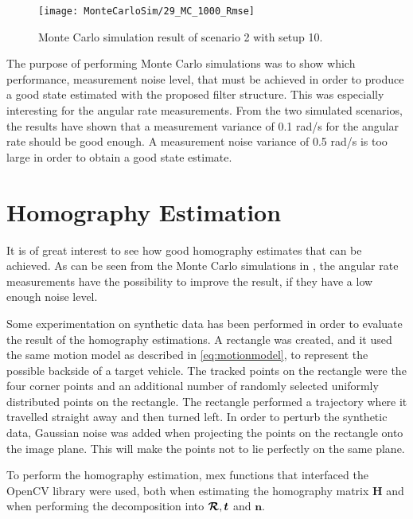 \begin{figure}[!ht]
	\centering
	\texttt{[image: MonteCarloSim/29\_MC\_1000\_Rmse]}
	\caption{\label{fig:29montesimcrossingroiangvelcornerrmse} Monte Carlo simulation result of scenario 2 with setup 10.}
\end{figure}

\newpage

The purpose of performing Monte Carlo simulations was to show which performance, \ie measurement noise level, that must be achieved in order to produce a good state estimated with the proposed filter structure.
This was especially interesting for the angular rate measurements.
From the two simulated scenarios, the results have shown that a measurement variance of 0.1 rad/s for the angular rate should be good enough.
A measurement noise variance of 0.5 rad/s is too large in order to obtain a good state estimate.

\newpage

\section{Homography Estimation}
\label{sec:homographyestimationresults}
It is of great interest to see how good homography estimates that can be achieved.
As can be seen from the Monte Carlo simulations in , the angular rate measurements have the possibility to improve the result, if they have a low enough noise level.

Some experimentation on synthetic data has been performed in order to evaluate the result of the homography estimations.
A rectangle was created, and it used the same motion model as described in \eqref{eq:motionmodel}, to represent the possible backside of a target vehicle.
The tracked points on the rectangle were the four corner points and an additional number of randomly selected uniformly distributed points on the rectangle.
The rectangle performed a trajectory where it travelled straight away and then turned left.
In order to perturb the synthetic data, Gaussian noise was added when projecting the points on the rectangle onto the image plane.
This will make the points not to lie perfectly on the same plane.

To perform the homography estimation, \matlab mex functions that interfaced the OpenCV library \cite{mexopencv} were used, both when estimating the homography matrix $\bm{H}$ and when performing the decomposition into $\bm{\mathcal{R}}, \bm{t}$ and $\bm{n}$.

